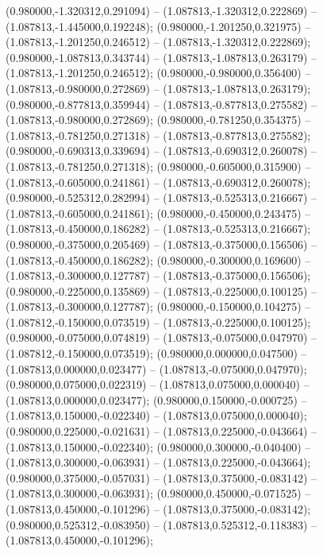  (0.980000,-1.320312,0.291094) -- (1.087813,-1.320312,0.222869) -- (1.087813,-1.445000,0.192248);
 (0.980000,-1.201250,0.321975) -- (1.087813,-1.201250,0.246512) -- (1.087813,-1.320312,0.222869);
 (0.980000,-1.087813,0.343744) -- (1.087813,-1.087813,0.263179) -- (1.087813,-1.201250,0.246512);
 (0.980000,-0.980000,0.356400) -- (1.087813,-0.980000,0.272869) -- (1.087813,-1.087813,0.263179);
 (0.980000,-0.877813,0.359944) -- (1.087813,-0.877813,0.275582) -- (1.087813,-0.980000,0.272869);
 (0.980000,-0.781250,0.354375) -- (1.087813,-0.781250,0.271318) -- (1.087813,-0.877813,0.275582);
 (0.980000,-0.690313,0.339694) -- (1.087813,-0.690312,0.260078) -- (1.087813,-0.781250,0.271318);
 (0.980000,-0.605000,0.315900) -- (1.087813,-0.605000,0.241861) -- (1.087813,-0.690312,0.260078);
 (0.980000,-0.525312,0.282994) -- (1.087813,-0.525313,0.216667) -- (1.087813,-0.605000,0.241861);
 (0.980000,-0.450000,0.243475) -- (1.087813,-0.450000,0.186282) -- (1.087813,-0.525313,0.216667);
 (0.980000,-0.375000,0.205469) -- (1.087813,-0.375000,0.156506) -- (1.087813,-0.450000,0.186282);
 (0.980000,-0.300000,0.169600) -- (1.087813,-0.300000,0.127787) -- (1.087813,-0.375000,0.156506);
 (0.980000,-0.225000,0.135869) -- (1.087813,-0.225000,0.100125) -- (1.087813,-0.300000,0.127787);
 (0.980000,-0.150000,0.104275) -- (1.087812,-0.150000,0.073519) -- (1.087813,-0.225000,0.100125);
 (0.980000,-0.075000,0.074819) -- (1.087813,-0.075000,0.047970) -- (1.087812,-0.150000,0.073519);
 (0.980000,0.000000,0.047500) -- (1.087813,0.000000,0.023477) -- (1.087813,-0.075000,0.047970);
 (0.980000,0.075000,0.022319) -- (1.087813,0.075000,0.000040) -- (1.087813,0.000000,0.023477);
 (0.980000,0.150000,-0.000725) -- (1.087813,0.150000,-0.022340) -- (1.087813,0.075000,0.000040);
 (0.980000,0.225000,-0.021631) -- (1.087813,0.225000,-0.043664) -- (1.087813,0.150000,-0.022340);
 (0.980000,0.300000,-0.040400) -- (1.087813,0.300000,-0.063931) -- (1.087813,0.225000,-0.043664);
 (0.980000,0.375000,-0.057031) -- (1.087813,0.375000,-0.083142) -- (1.087813,0.300000,-0.063931);
 (0.980000,0.450000,-0.071525) -- (1.087813,0.450000,-0.101296) -- (1.087813,0.375000,-0.083142);
 (0.980000,0.525312,-0.083950) -- (1.087813,0.525312,-0.118383) -- (1.087813,0.450000,-0.101296);
